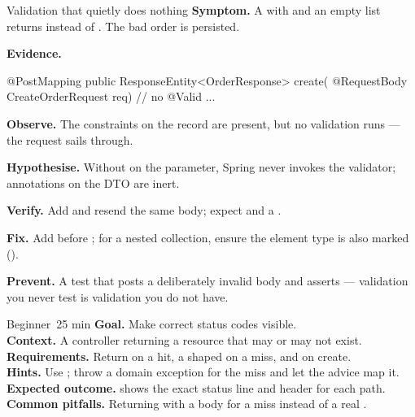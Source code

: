 \begin{debuglab}{Validation that quietly does nothing}
\textbf{Symptom.} A  with  and an empty  list returns  instead of . The bad order is persisted.

\smallskip\textbf{Evidence.}
\begin{javabox}
@PostMapping
public ResponseEntity<OrderResponse> create(
    @RequestBody CreateOrderRequest req) {   // no @Valid
  ...
}
\end{javabox}

\begin{tickcheck}
  \item \textbf{Observe.} The constraints on the record are present, but no validation runs --- the request sails through.
  \item \textbf{Hypothesise.} Without  on the parameter, Spring never invokes the validator; annotations on the DTO are inert.
  \item \textbf{Verify.} Add  and resend the same body; expect  and a .
  \item \textbf{Fix.} Add  before ; for a nested collection, ensure the element type is also marked ().
  \item \textbf{Prevent.} A test that posts a deliberately invalid body and asserts  --- validation you never test is validation you do not have.
\end{tickcheck}
\end{debuglab}


\begin{minilab}{Beginner}{~25 min}
\textbf{Goal.} Make correct status codes visible.\\
\textbf{Context.} A controller returning a resource that may or may not exist.\\
\textbf{Requirements.} Return  on a hit, a shaped  on a miss, and  on create.\\
\textbf{Hints.} Use ; throw a domain exception for the miss and let the advice map it.\\
\textbf{Expected outcome.}  shows the exact status line and  header for each path.\\
\textbf{Common pitfalls.} Returning  with a  body for a miss instead of a real .
\end{minilab}

